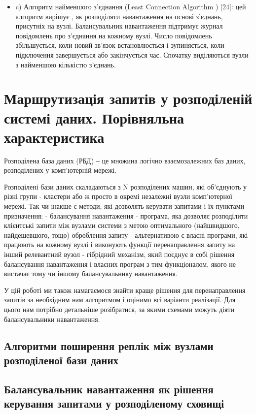 \documentclass[14pt]{vakthesis}
\begin{document}
\begin{enumerate}
\begin{itemize}
\item c)  Алгоритм найменшого з'єднання (Least  Connection  Algorithm ) [24]: цей алгоритм вирішує , як розподіляти навантаження на основі з'єднань, 
присутніх на вузлі. Балансувальник навантаження підтримує журнал повідомлень про з'єднання на кожному вузлі. Число повідомлень збільшується, коли новий
зв'язок встановлюється і зупиняється, коли підключення завершується або закінчується час. Спочатку виділяються вузли з найменшою кількістю з'єднань.

\end{itemize}
\end{enumerate}

\chapter{Маршрутизація запитів у розподіленій системі даних. Порівняльна характеристика}

Розподілена база даних (РБД) ‒ це множина логічно взаємозалежних баз даних, розподілених у комп’ютерній мережі.

Розподілені бази даних  скаладаються з N розподілених машин, які об'єднують у різні групи - кластери або ж просто в окремі незалежні вузли комп'ютерної мережі.
Так чи інакше є методи, які дозволять керувати запитами і їх пунктами призначення:
 - балансування навантаження - програма, яка дозволяє розподілити клієнтські запити між вузлами системи з метою оптимального (найшвидшого, найдешевшого, тощо) оброблення запиту
 - альтернативою є власні програми, які працюють на кожному вузлі і виконують функції перенаправлення запиту на інший релевантний вузол
 - гібрідний механізм, який поєднує в собі рішення балансування навантаження і власних програм з тим функціоналом, якого не вистачає тому чи іншому балансувальнику навантаження.

У цій роботі ми також намагаємося знайти краще рішення для перенаправлення запитів за необхідним нам алгоритмом і оцінимо всі варіанти реалізації. Для цього нам потрібно детальніше розібратися, за якими схемами можуть діяти балансувальники навантаження.


\section{Алгоритми поширення реплік між вузлами розподіленої бази даних}
\section{Балансувальник навантаження як рішення керування запитами у розподіленому сховищі}
\end{document}
